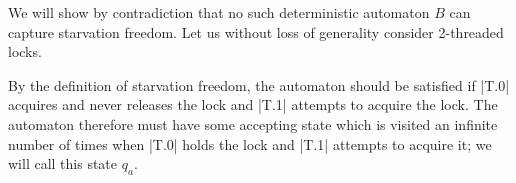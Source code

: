


We will show by contradiction that no such deterministic automaton $B$ can capture starvation freedom. Let us without loss of generality consider 2-threaded locks. 

By the definition of starvation freedom, the automaton should be satisfied if |T.0| acquires and never releases the lock and |T.1| attempts to acquire the lock. The automaton therefore must have some accepting state which is visited an infinite number of times when |T.0| holds the lock and |T.1| attempts to acquire it; we will call this state $q_{a}$.



